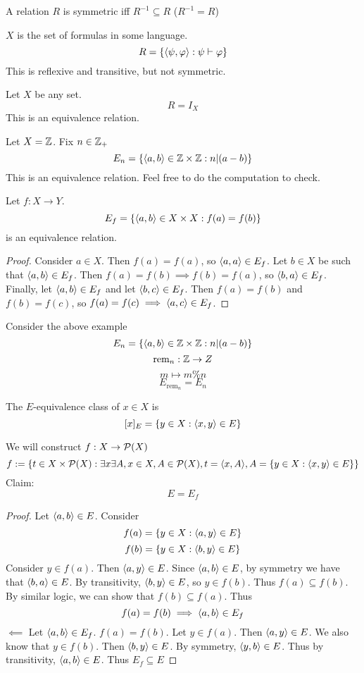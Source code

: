\begin{prop}
A relation $R$ is symmetric iff $R^{-1} \subseteq R$ ($R^{-1} = R$)
\end{prop}
\begin{ex}
$X$ is the set of formulas in some language.
\[R = \{\la \psi, \varphi \ra: \psi \vdash \varphi\}\]
This is reflexive and transitive, but not symmetric.
\end{ex}
\begin{ex}
    Let $X$ be any set. 
    \[R = I_X\]
    This is an equivalence relation.
\end{ex}
\begin{ex}
    Let $X = \Z$. Fix $n \in \Z_+$
    \[E_n = \{\la a, b\ra \in \Z \times \Z: n | (a - b)\}\]
    This is an equivalence relation. Feel free to do the computation to check.
\end{ex}
\begin{prop}
Let $f: X \to Y$. 
\[E_f = \{\la a, b\ra \in X \times X: f(a) = f(b)\}\]
is an equivalence relation.
\end{prop}
\begin{proof}
Consider $a \in X$. Then $f(a) = f(a)$, so $\la a, a\ra \in E_f$. Let $b \in X$ be such that $\la a, b\ra \in E_f$.
Then $f(a) = f(b) \implies f(b) = f(a)$, so $\la b, a\ra \in E_f$. Finally, let $\la a, b\ra \in E_f$ and let $\la b, c\ra \in E_f$.
Then $f(a) = f(b)$ and $f(b) = f(c)$, so $f(a) = f(c) \implies \la a, c\ra \in E_f$.
\end{proof}
\begin{ex}
Consider the above example
\[E_n = \{\la a, b\ra \in \Z \times \Z: n | (a - b)\}\]
\[\text{rem}_n : \Z \to Z\]
\[m \mapsto m \% n\]
\[E_{\text{rem}_n} = E_n\]
\end{ex}
\begin{defn}
The $E$-equivalence class of $x \in X$ is
\[[x]_E = \{y \in X: \la x, y\ra \in E\}\]
\end{defn}
\begin{prop}
We will construct $f: X \to \P(X)$ 
\[f := \{t \in X \times \P(X): \exists x \exists A, x \in X, A \in \P(X), t = \la x, A\ra, A = \{y \in X: \la x, y \ra \in E\}\}\]
Claim:
\[E = E_f\]
\end{prop}
\begin{proof}
Let $\la a, b\ra \in E$. Consider 
\[f(a) = \{y \in X: \la a, y\ra \in E\}\]
\[f(b) = \{y \in X: \la b, y\ra \in E\}\]
Consider $y \in f(a)$. Then $\la a, y\ra \in E$. Since $\la a, b\ra \in E$, by symmetry we have that $\la b, a\ra \in E$. By 
transitivity, $\la b, y\ra \in E$, so $y \in f(b)$. Thus $f(a) \subseteq f(b)$. By similar logic, we can show that $f(b)\subseteq f(a)$.
Thus 
\[f(a) = f(b) \implies \la a, b\ra \in E_f\]
$\impliedby$ Let $\la a, b\ra \in E_f$. $f(a) = f(b)$. Let $y \in f(a)$. Then $\la a, y\ra \in E$. We also know that 
$y \in f(b)$. Then $\la b, y\ra \in E$. By symmetry, $\la y, b\ra \in E$. Thus by transitivity, $\la a, b\ra \in E$.
Thus $E_f \subseteq E$
\end{proof}
